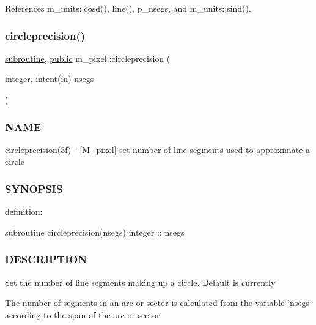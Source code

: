 References m\+\_\+units\+::cosd(), line(), p\+\_\+nsegs, and m\+\_\+units\+::sind().

\mbox{\label{namespacem__pixel_a68ca1be8f7a92ece6efce8d69987af9c}} 
\subsubsection{\texorpdfstring{circleprecision()}{circleprecision()}}
{\footnotesize\ttfamily \hyperlink{M__stopwatch_83_8txt_acfbcff50169d691ff02d4a123ed70482}{subroutine}, \hyperlink{M__stopwatch_83_8txt_a2f74811300c361e53b430611a7d1769f}{public} m\+\_\+pixel\+::circleprecision (\begin{DoxyParamCaption}\item[{integer, intent(\hyperlink{M__journal_83_8txt_afce72651d1eed785a2132bee863b2f38}{in})}]{nsegs }\end{DoxyParamCaption})}



\subsubsection*{N\+A\+ME}

circleprecision(3f) -\/ \mbox{[}M\+\_\+pixel\mbox{]} set number of line segments used to approximate a circle 

\subsubsection*{S\+Y\+N\+O\+P\+S\+IS}

definition\+:

subroutine circleprecision(nsegs) integer \+:\+: nsegs

\subsubsection*{D\+E\+S\+C\+R\+I\+P\+T\+I\+ON}

Set the number of line segments making up a circle. Default is currently
\begin{DoxyEnumerate}
\item The number of segments in an arc or sector is calculated from the variable \char`\"{}nsegs\char`\"{} according to the span of the arc or sector.
\end{DoxyEnumerate}

